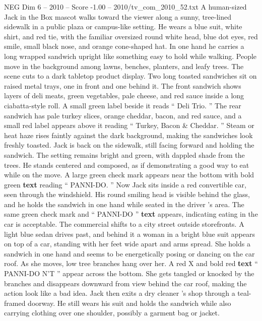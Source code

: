 \begin{textsample}{NEG Dim 6 – 2010 – Score -1.00 – 2010/tv\_com\_2010\_52.txt}  \label{ex:f6_neg_017}
A human-sized Jack in the Box mascot walks toward the viewer along a sunny, tree-lined sidewalk in a public plaza or campus-like setting.
He wears a blue suit, white shirt, and red tie, with the familiar oversized round white head, blue dot eyes, red smile, small black nose, and orange cone-shaped hat.
In one hand he carries a long wrapped sandwich upright like something easy to hold while walking.
People move in the background among lawns, benches, planters, and leafy trees.
The scene cuts to a dark tabletop product display.
Two long toasted sandwiches sit on raised metal trays, one in front and one behind it.
The front sandwich shows layers of deli meats, green vegetables, pale cheese, and red sauce inside a long ciabatta-style roll.
A small green label beside it reads “ Deli Trio. ” The rear sandwich has pale turkey slices, orange cheddar, bacon, and red sauce, and a small red label appears above it reading “ Turkey, Bacon \& Cheddar. ” Steam or heat haze rises faintly against the dark background, making the sandwiches look freshly toasted.
Jack is back on the sidewalk, still facing forward and holding the sandwich.
The setting remains bright and green, with dappled shade from the trees.
He stands centered and composed, as if demonstrating a good way to eat while on the move.
A large green check mark appears near the bottom with bold green \textbf{text} reading “ PANNI-DO. ” Now Jack sits inside a red convertible car, seen through the windshield.
His round smiling head is visible behind the glass, and he holds the sandwich in one hand while seated in the driver ’s area.
The same green check mark and “ PANNI-DO ” \textbf{text} appears, indicating eating in the car is acceptable.
The commercial shifts to a city street outside storefronts.
A light blue sedan drives past, and behind it a woman in a bright blue suit appears on top of a car, standing with her feet wide apart and arms spread.
She holds a sandwich in one hand and seems to be energetically posing or dancing on the car roof.
As she moves, low tree branches hang over her.
A red X and bold red \textbf{text} “ PANNI-DO N’T ” appear across the bottom.
She gets tangled or knocked by the branches and disappears downward from view behind the car roof, making the action look like a bad idea.
Jack then exits a dry cleaner ’s shop through a teal-framed doorway.
He still wears his suit and holds the sandwich while also carrying clothing over one shoulder, possibly a garment bag or jacket.

\end{textsample}
